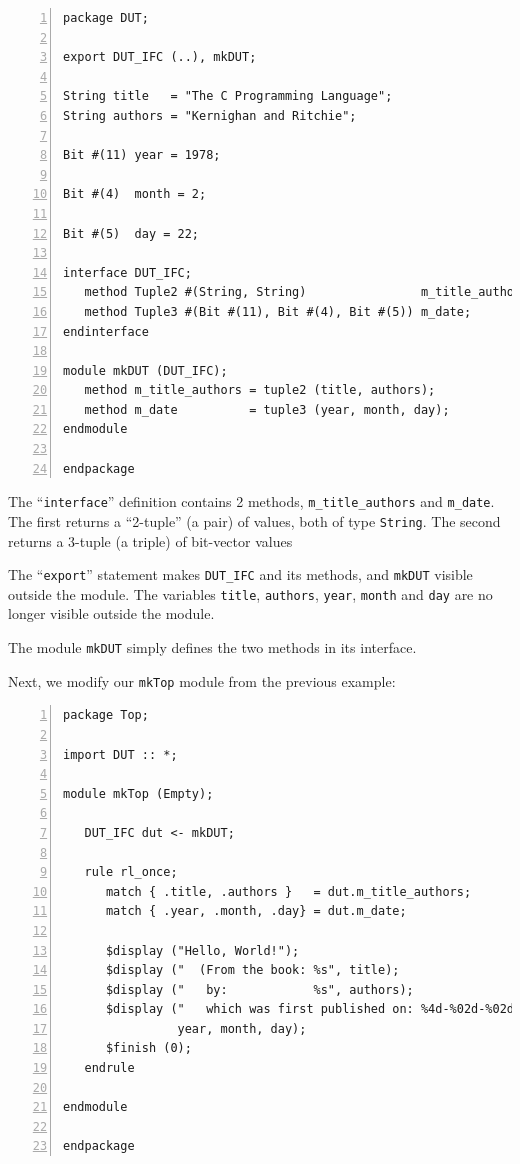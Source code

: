 {\small
\begin{Verbatim}[frame=single, numbers=left, label=in file Ex\_04\_04/DUT.bsv]
package DUT;

export DUT_IFC (..), mkDUT;

String title   = "The C Programming Language";
String authors = "Kernighan and Ritchie";

Bit #(11) year = 1978;

Bit #(4)  month = 2;

Bit #(5)  day = 22;

interface DUT_IFC;
   method Tuple2 #(String, String)                m_title_authors;
   method Tuple3 #(Bit #(11), Bit #(4), Bit #(5)) m_date;
endinterface

module mkDUT (DUT_IFC);
   method m_title_authors = tuple2 (title, authors);
   method m_date          = tuple3 (year, month, day);
endmodule

endpackage
\end{Verbatim}
}

The ``\verb|interface|'' definition contains 2 methods,
\verb|m_title_authors| and \verb|m_date|.  The first returns a
``2-tuple'' (a pair) of values, both of type \verb|String|.  The
second returns a 3-tuple (a triple) of bit-vector values

The ``\verb|export|'' statement makes \verb|DUT_IFC| and its methods,
and \verb|mkDUT| visible outside the module.  The variables
\verb|title|, \verb|authors|, \verb|year|, \verb|month| and \verb|day|
are no longer visible outside the module.

The module \verb|mkDUT| simply defines the two methods in its interface.

Next, we modify our \verb|mkTop| module from the previous example:

{\small
\begin{Verbatim}[frame=single, numbers=left, label=in file Ex\_04\_04/Top.bsv]
package Top;

import DUT :: *;

module mkTop (Empty);

   DUT_IFC dut <- mkDUT;

   rule rl_once;
      match { .title, .authors }   = dut.m_title_authors;
      match { .year, .month, .day} = dut.m_date;

      $display ("Hello, World!");
      $display ("  (From the book: %s", title);
      $display ("   by:            %s", authors);
      $display ("   which was first published on: %4d-%02d-%02d)",
                year, month, day);
      $finish (0);
   endrule

endmodule

endpackage
\end{Verbatim}
}

